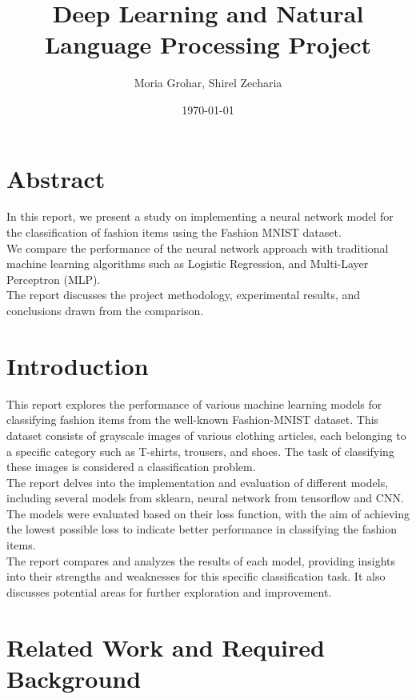 \documentclass{article}
\title{Deep Learning and Natural Language Processing Project}
\author{Moria Grohar, Shirel Zecharia}
\date{\today}
\begin{document}
\maketitle
\tableofcontents
\newpage

\section{Abstract}
In this report, we present a study on implementing a neural network model for the classification of fashion items using the Fashion MNIST dataset.\\
We compare the performance of the neural network approach with traditional machine learning algorithms such as Logistic Regression, and Multi-Layer Perceptron (MLP).\\
The report discusses the project methodology, experimental results, and conclusions drawn from the comparison.

\section{Introduction}
This report explores the performance of various machine learning models for classifying fashion items from the well-known Fashion-MNIST dataset. This dataset consists of grayscale images of various clothing articles, each belonging to a specific category such as T-shirts, trousers, and shoes. The task of classifying these images is considered a classification problem.\\
The report delves into the implementation and evaluation of different models,
including several models from sklearn, neural network from tensorflow and CNN.\\
The models were evaluated based on their loss function, with the aim of achieving the lowest possible loss to indicate better performance in classifying the fashion items.\\
The report compares and analyzes the results of each model, providing insights into their strengths and weaknesses for this specific classification task. It also discusses potential areas for further exploration and improvement.

\section{Related Work and Required Background}
\end{document}
